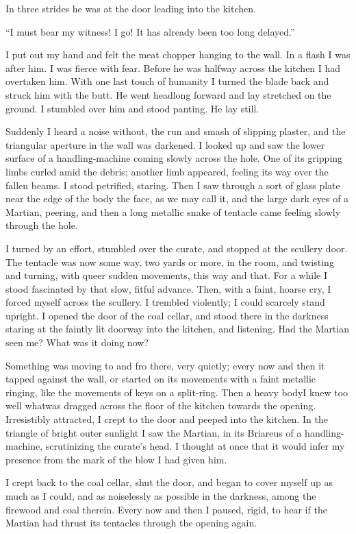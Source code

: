 In three strides he was at the door leading into the kitchen.

``I must bear my witness! I go! It has already been too long
delayed.''

I put out my hand and felt the meat chopper hanging to the wall. In
a flash I was after him. I was fierce with fear. Before he was
halfway across the kitchen I had overtaken him. With one last touch
of humanity I turned the blade back and struck him with the butt.
He went headlong forward and lay stretched on the ground. I
stumbled over him and stood panting. He lay still.

Suddenly I heard a noise without, the run and smash of slipping
plaster, and the triangular aperture in the wall was darkened. I
looked up and saw the lower surface of a handling-machine coming
slowly across the hole. One of its gripping limbs curled amid the
debris; another limb appeared, feeling its way over the fallen
beams. I stood petrified, staring. Then I saw through a sort of
glass plate near the edge of the body the face, as we may call it,
and the large dark eyes of a Martian, peering, and then a long
metallic snake of tentacle came feeling slowly through the hole.

I turned by an effort, stumbled over the curate, and stopped at the
scullery door. The tentacle was now some way, two yards or more, in
the room, and twisting and turning, with queer sudden movements,
this way and that. For a while I stood fascinated by that slow,
fitful advance. Then, with a faint, hoarse cry, I forced myself
across the scullery. I trembled violently; I could scarcely stand
upright. I opened the door of the coal cellar, and stood there in
the darkness staring at the faintly lit doorway into the kitchen,
and listening. Had the Martian seen me? What was it doing now?

Something was moving to and fro there, very quietly; every now and
then it tapped against the wall, or started on its movements with a
faint metallic ringing, like the movements of keys on a split-ring.
Then a heavy body\dash{}I knew too well what\dash{}was dragged across the
floor of the kitchen towards the opening. Irresistibly attracted, I
crept to the door and peeped into the kitchen. In the triangle of
bright outer sunlight I saw the Martian, in its Briareus of a
handling-machine, scrutinizing the curate's head. I thought at once
that it would infer my presence from the mark of the blow I had
given him.

I crept back to the coal cellar, shut the door, and began to cover
myself up as much as I could, and as noiselessly as possible in the
darkness, among the firewood and coal therein. Every now and then I
paused, rigid, to hear if the Martian had thrust its tentacles
through the opening again.

